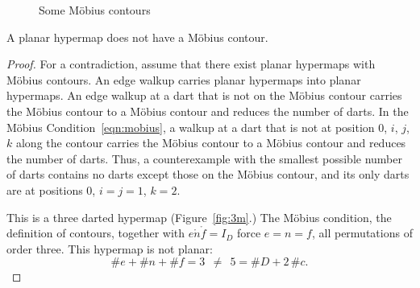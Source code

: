 \begin{figure}[htb]
\centering
{}
\caption{Some M\"obius contours}
\label{fig:mobius-contour}
\end{figure}






\begin{lemma}
A planar hypermap does not have a M\"obius contour.
\end{lemma}
%

\begin{proof} For a contradiction, assume that there exist planar
hypermaps with M\"obius contours.  An edge walkup carries
planar hypermaps into planar hypermaps. An edge walkup
at a dart that is not on the M\"obius contour carries the
M\"obius contour to a M\"obius contour 
and reduces the number of darts.  
In the M\"obius Condition~\ref{eqn:mobius},
a walkup at a dart that is not at position $0$, $i$, $j$, $k$
along the contour carries the M\"obius contour to a M\"obius contour
and reduces the number of darts. Thus, a counterexample with
the smallest possible number of darts contains no
darts except those on the M\"obius contour, and its only darts
are at positions $0$, $i=j=1$, $k=2$.

This is a three darted hypermap (Figure~\ref{fig:3m}.)  
The M\"obius condition, the
definition of contours, together with $e\ocirc n\ocirc f=I_D$ force
$e=n=f$, all permutations of order three.  This hypermap is not planar:
\begin{displaymath}\# e + \# n + \# f = 3~~\ne~~ 5 = \# D + 2\,
\#c.\end{displaymath}
\end{proof}



%
%

